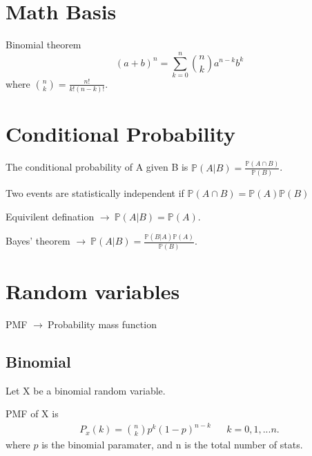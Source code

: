 \documentclass[legalpaper]{article}
\newcommand{\prob}{\mathbb{P}}
\newcommand{\g}{$\rightarrow\ $}
\begin{document}
\section{Math Basis}

\begin{theorem}{Binomial theorem}{}
  \[
    (a+b)^n = \sum_{k=0}^n \binom{n}{k} a^{n-k}b^k
  \]
  where $\binom{n}{k} = \frac{n!}{k!(n-k)!}$.
\end{theorem}

\section{Conditional Probability}


\begin{define}{}{}
   The conditional probability of A given B is $\prob(A|B) = \frac{\prob(A\cap B)}{\prob(B)}$.
\end{define}

\begin{define}{}{}
  Two events are statistically independent if $\prob(A\cap B) = \prob(A)\prob(B)$
\end{define}

Equivilent defination \g $\prob(A|B) = \prob(A)$.

\begin{theorem}{}{}
  Bayes’ theorem \g $\prob(A|B) = \frac{\prob (B|A)\prob(A)}{\prob(B)}$.
\end{theorem}


\section{Random variables}

PMF \g Probability mass function

\subsection{Binomial}

\begin{define}{}{}
  Let X be a binomial random variable.

  PMF of X is
  \begin{align}
    P_x(k) = \binom{n}{k}p^k(1-p)^{n-k} &&k=0,1,...n.
  \end{align}
  where $p$ is the binomial paramater, and n is the total number of stats.

\end{define}
\end{document}
